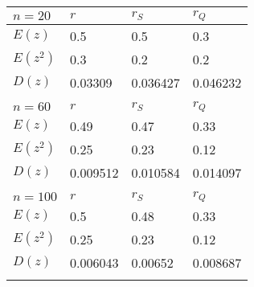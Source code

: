 \begin{tabular}{|l|l|l|l|}\hline $n=20$&$r$&$r_S$&$r_Q$  \\\hline$E(z)$&0.5&0.5&0.3\\\hline$E(z^2)$&0.3&0.2&0.2\\\hline$D(z)$&0.03309&0.036427&0.046232\\\hline &  &  &  \\\hline $n=60$&$r$&$r_S$&$r_Q$  \\\hline$E(z)$&0.49&0.47&0.33\\\hline$E(z^2)$&0.25&0.23&0.12\\\hline$D(z)$&0.009512&0.010584&0.014097\\\hline &  &  &  \\\hline $n=100$&$r$&$r_S$&$r_Q$  \\\hline$E(z)$&0.5&0.48&0.33\\\hline$E(z^2)$&0.25&0.23&0.12\\\hline$D(z)$&0.006043&0.00652&0.008687\\\hline &  &  &  \\\hline \end{tabular}

